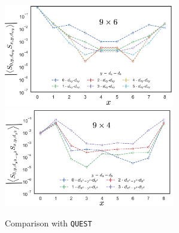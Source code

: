 \begin{figure}[H]
  \centering
  \includegraphics[width=7.5cm]{images/tmdFinalxyxy.png}
    \includegraphics[width=7.5cm]{images/tmdFinalx2y2z2.png}
  \caption{Comparison with \texttt{QUEST}}
  \label{fig:blade_flow_pressure}
\end{figure}








